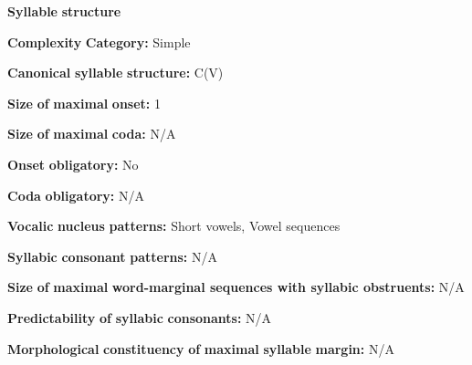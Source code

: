 \begin{styleBody}
\textbf{Syllable} \textbf{structure}
\end{styleBody}

\begin{styleBody}
\textbf{Complexity} \textbf{Category:} Simple
\end{styleBody}

\begin{styleBody}
\textbf{Canonical} \textbf{syllable} \textbf{structure:} C(V) \citep[163-7]{Chacon2012}
\end{styleBody}

\begin{styleBody}
\textbf{Size} \textbf{of} \textbf{maximal} \textbf{onset:} 1
\end{styleBody}

\begin{styleBody}
\textbf{Size} \textbf{of} \textbf{maximal} \textbf{coda:} N/A
\end{styleBody}

\begin{styleBody}
\textbf{Onset} \textbf{obligatory:} No
\end{styleBody}

\begin{styleBody}
\textbf{Coda} \textbf{obligatory:} N/A
\end{styleBody}

\begin{styleBody}
\textbf{Vocalic} \textbf{nucleus} \textbf{patterns:} Short vowels, Vowel sequences
\end{styleBody}

\begin{styleBody}
\textbf{Syllabic} \textbf{consonant} \textbf{patterns:} N/A
\end{styleBody}

\begin{styleBody}
\textbf{Size} \textbf{of} \textbf{maximal} \textbf{word{}-marginal sequences with syllabic obstruents:} N/A
\end{styleBody}

\begin{styleBody}
\textbf{Predictability} \textbf{of} \textbf{syllabic} \textbf{consonants:} N/A
\end{styleBody}

\begin{styleBody}
\textbf{Morphological} \textbf{constituency} \textbf{of} \textbf{maximal} \textbf{syllable} \textbf{margin:} N/A
\end{styleBody}

